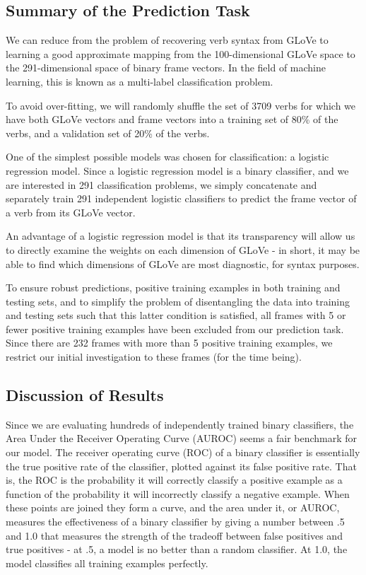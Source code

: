 \documentclass[a4paper]{article}
\begin{document}
\subsection{Summary of the Prediction Task}

We can reduce from the problem of recovering verb syntax from GLoVe to learning a good approximate mapping from the 100-dimensional GLoVe space to the 291-dimensional space of binary frame vectors. In the field of machine learning, this is known as a multi-label classification problem.

To avoid over-fitting, we will randomly shuffle the set of 3709 verbs for which we have both GLoVe vectors and frame vectors into a training set of 80\% of the verbs, and a validation set of 20\% of the verbs.

One of the simplest possible models was chosen for classification: a logistic regression model. Since a logistic regression model is a binary classifier, and we are interested in 291 classification problems, we simply concatenate and separately train 291 independent logistic classifiers to predict the frame vector of a verb from its GLoVe vector.

An advantage of a logistic regression model is that its transparency will allow us to directly examine the weights on each dimension of GLoVe - in short, it may be able to find which dimensions of GLoVe are most diagnostic, for syntax purposes. 

To ensure robust predictions, positive training examples in both training and testing sets, and to simplify the problem of disentangling the data into training and testing sets such that this latter condition is satisfied, all frames with 5 or fewer positive training examples have been excluded from our prediction task. Since there are 232 frames with more than 5 positive training examples, we restrict our initial investigation to these frames (for the time being).

\subsection{Discussion of Results}

Since we are evaluating hundreds of independently trained binary classifiers, the Area Under the Receiver Operating Curve (AUROC) seems a fair benchmark for our model. The receiver operating curve (ROC) of a binary classifier is essentially the true positive rate of the classifier, plotted against its false positive rate. That is, the ROC is the probability it will correctly classify a positive example as a function of the probability it will incorrectly classify a negative example. When these points are joined they form a curve, and the area under it, or AUROC, measures the effectiveness of a binary classifier by giving a number between .5 and 1.0 that measures the strength of the tradeoff between false positives and true positives - at .5, a model is no better than a random classifier. At 1.0, the model classifies all training examples perfectly. 
\end{document}
